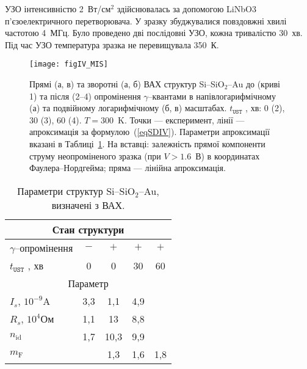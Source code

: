 \documentclass[a4paper,14pt,oneside,openany]{memoir}
\begin{document}
УЗО інтенсивністю 2~Вт/см$^2$ здійснювалась за допомогою LiNbO$3$ п'єзоелектричного перетворювача.
У зразку збуджувалися повздовжні хвилі частотою 4~МГц.
Було проведено дві послідовні УЗО, кожна тривалістю 30~хв.
Під час УЗО температура зразка не перевищувала 350~К.


\begin{figure}
\center
\texttt{[image: figIV\_MIS]}%
\caption{\label{figIV_MIS}
Прямі (а, в) та зворотні (а, б) ВАХ структур Si--SiO$_2$--Au до (криві 1)
та після (2--4) опромінення $\gamma$--квантами в напівлогарифмічному (а)
та подвійному логарифмічному (б, в) масштабах.
$t_\mathtt{UST}$ , хв: 0 (2), 30 (3), 60 (4).
$T=300$~K.
Точки --- експеримент, 
лінії --- апроксимація за формулою~(\ref{eqSDIV}).
Параметри апроксимації вказані в Таблиці~\ref{tabMIS}.
На вставці:
залежність прямої компоненти струму неопроміненого зразка (при $V>1.6$~В) в координатах Фаулера--Нордгейма;
пряма --- лінійна апроксимація.
}%
\end{figure}


\begin{table}
\caption{\label{tabMIS}Параметри структур Si--SiO$_2$--Au, визначені з ВАХ.
}
\center
\begin{tabular}{|l|c|c|c|c|}
\hline
\multicolumn{5}{|c|}{Стан структури}\\\hline
$\gamma$--опромінення&$-$&$+$&$+$&$+$\\ \hline
$t_\mathtt{UST}$ , хв&0&0&30&60\\ \hline
\multicolumn{5}{|c|}{Параметр}\\\hline
$I_s$, $10^{-9}$A & 3,3& 1,1& 4,9& \\ \hline
$R_s$, $10^{4}$Ом & 1,1& 13& 8,8& \\ \hline
$n_\mathrm{id}$ & 1,7& 10,3& 9,9& \\ \hline
$m_\mathrm{F}$ & &1,3& 1,6& 1,8 \\ \hline
\end{tabular}
\end{table}
\end{document}
